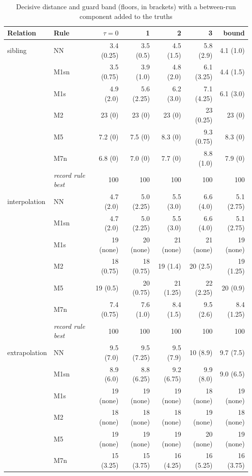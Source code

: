 \documentclass[pdflatex,sn-basic]{sn-jnl}
\newcommand{\tabsizesmall}{\footnotesize}
\begin{document}
\begin{table}[p]
\tabsizesmall
\setlength{\tabcolsep}{3pt}
\caption{Decisive distance and guard band (floors, in brackets) with a between-run component added to the truths}\label{tab:s-between}
\begin{tabular}{@{}llrrrrr@{}}
\toprule
Relation & Rule & $\tau=0$ & 1 & 2 & 3 & bound \\
\midrule
sibling & NN & 3.4 (0.25) & 3.5 (0.5) & 4.5 (1.5) & 5.8 (2.9) & 4.1 (1.0) \\
 & M1sn & 3.5 (0.75) & 3.9 (1.0) & 4.8 (2.0) & 6.1 (3.25) & 4.4 (1.5) \\
 & M1s & 4.9 (2.0) & 5.6 (2.25) & 6.2 (3.0) & 7.1 (4.25) & 6.1 (3.0) \\
 & M2 & 23 (0) & 23 (0) & 23 (0) & 23 (0.25) & 23 (0) \\
 & M5 & 7.2 (0) & 7.5 (0) & 8.3 (0) & 9.3 (0.75) & 8.3 (0) \\
 & M7n & 6.8 (0) & 7.0 (0) & 7.7 (0) & 8.8 (1.0) & 7.9 (0) \\
& \emph{record rule best} & 100 & 100 & 100 & 100 & 100 \\
interpolation & NN & 4.7 (2.0) & 5.0 (2.25) & 5.5 (3.0) & 6.6 (4.0) & 5.1 (2.75) \\
 & M1sn & 4.7 (2.0) & 5.0 (2.25) & 5.5 (3.0) & 6.6 (4.0) & 5.1 (2.75) \\
 & M1s & 19 (none) & 20 (none) & 21 (none) & 21 (none) & 19 (none) \\
 & M2 & 18 (0.75) & 18 (0.75) & 19 (1.4) & 20 (2.5) & 19 (1.25) \\
 & M5 & 19 (0.5) & 20 (0.75) & 21 (1.25) & 22 (2.25) & 20 (0.9) \\
 & M7n & 7.4 (0.75) & 7.6 (1.0) & 8.4 (1.5) & 9.5 (2.6) & 8.4 (1.25) \\
& \emph{record rule best} & 100 & 100 & 100 & 100 & 100 \\
extrapolation & NN & 9.5 (7.0) & 9.5 (7.25) & 9.5 (7.9) & 10 (8.9) & 9.7 (7.5) \\
 & M1sn & 8.9 (6.0) & 8.8 (6.25) & 9.2 (6.75) & 9.9 (8.0) & 9.0 (6.5) \\
 & M1s & 19 (none) & 19 (none) & 19 (none) & 18 (none) & 19 (none) \\
 & M2 & 18 (none) & 18 (none) & 18 (none) & 19 (none) & 18 (none) \\
 & M5 & 19 (none) & 19 (none) & 19 (none) & 20 (none) & 19 (none) \\
 & M7n & 15 (3.25) & 15 (3.75) & 16 (4.25) & 16 (5.25) & 16 (3.75) \\

\end{tabular}
\end{table}
\end{document}

